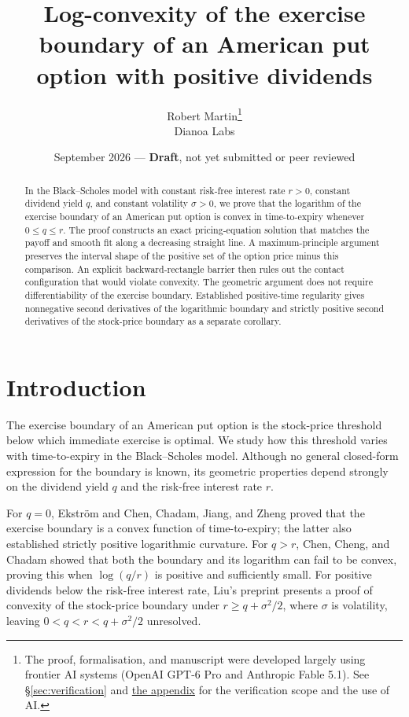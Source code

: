 \documentclass[11pt]{article}
\title{Log-convexity of the exercise boundary of an American put option with positive dividends}
\author{Robert Martin\thanks{The proof, formalisation, and manuscript were developed largely using
frontier AI systems (OpenAI GPT-6 Pro and Anthropic Fable 5.1). See \S\ref{sec:verification}
  and \hyperref[app:ai]{the appendix} for the verification scope and the use of AI.}\\
  Dianoa Labs}
\date{September 2026 --- \textbf{Draft}, not yet submitted or peer reviewed}
\begin{document}
\maketitle

\begin{abstract}
In the Black--Scholes model with constant risk-free interest rate $r>0$,
constant dividend yield $q$, and constant volatility $\sigma>0$, we prove
that the logarithm of the exercise boundary of an American put option is
convex in time-to-expiry whenever $0\le q\le r$. The proof
constructs an exact pricing-equation solution that matches the payoff
and smooth fit along a decreasing straight line. A maximum-principle
argument preserves the interval shape of the positive set of the option
price minus this comparison. An explicit backward-rectangle barrier then rules out
the contact configuration that would violate convexity. The geometric
argument does not require differentiability of the exercise boundary.
Established positive-time regularity gives nonnegative second derivatives
of the logarithmic boundary and strictly positive second derivatives
of the stock-price boundary as a separate corollary.
\end{abstract}

\section*{Introduction}

The exercise boundary of an American put option is the stock-price
threshold below which immediate exercise is optimal. We study how this
threshold varies with time-to-expiry in the Black--Scholes model. Although no general closed-form
expression for the boundary is known, its geometric properties depend
strongly on the dividend yield $q$ and the risk-free interest rate $r$.

For $q=0$, Ekstr\"om \cite{Ekstrom2004} and Chen, Chadam, Jiang,
and Zheng \cite{CCJZ2008} proved that the exercise boundary is a convex
function of time-to-expiry; the latter also
established strictly positive logarithmic curvature. For $q>r$,
Chen, Cheng, and Chadam \cite[Theorem~2]{CCC2013} showed that both
the boundary and its logarithm can fail to be convex, proving this
when $\log(q/r)$ is positive and sufficiently small. For positive
dividends below the risk-free interest rate, Liu's preprint \cite{Liu2017} presents
a proof of convexity of the stock-price boundary under
$r\ge q+\sigma^2/2$, where $\sigma$ is volatility, leaving
$0<q<r<q+\sigma^2/2$ unresolved.
\end{document}
